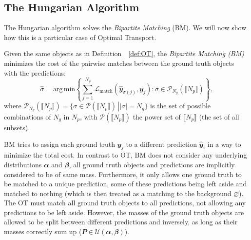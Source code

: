 \subsection{The Hungarian Algorithm}
The Hungarian algorithm solves the \emph{Bipartite Matching} (BM). We will now show how this is a particular case of Optimal Transport.

\begin{definition}
\label{def:lap}
Given the same objects as  in Definition~~\ref{def:OT}, the \emph{Bipartite Matching (BM)} minimizes the cost of the pairwise matches between the ground truth objects with the predictions:
\begin{equation}
    \hat{\sigma} = \mathrm{arg\, min} \left\{\sum_{j=1}^{N_g} \mathcal{L}_{\text{match}}\left(\hat{\mathbfit{y}}_{\sigma(j)},  \mathbfit{y}_{j} \right): \sigma \in \mathcal{P}_{N_g}(\llbracket N_p \rrbracket)\right\},
\end{equation}
where $\mathcal{P}_{N_g}(\llbracket N_p\rrbracket) = \left.\big\{\sigma \in \mathcal{P}(\llbracket N_p \rrbracket) \,\right| |\sigma| = N_g \big\}$ is the set of possible combinations of $N_g$ in $N_p$, with $\mathcal{P}(\llbracket N_p \rrbracket)$ the power set of $\llbracket N_p\rrbracket$ (the set of all subsets).
\end{definition}
%
BM tries to assign each ground truth $\mathbfit{y}_j$ to a different prediction $\hat{\mathbfit{y}}_i$ in a way to minimize the total cost. In contrast to OT, BM does not consider any underlying distributions $\mathbfit{\alpha}$ and $\mathbfit{\beta}$, all ground truth objects and predictions are implicitly considered to be of same mass. Furthermore, it only allows one ground truth to be matched to a unique prediction, some of these predictions being left aside and matched to nothing (which is then treated as a matching to the background $\varnothing$). The OT must match all ground truth objects to all predictions, not allowing any predictions to be left aside. However, the masses of the ground truth objects are allowed to be split between different predictions and inversely, as long as their masses correctly sum up ($\mathbfit{P} \in \mathcal{U}(\mathbfit{\alpha},\mathbfit{\beta})$).

